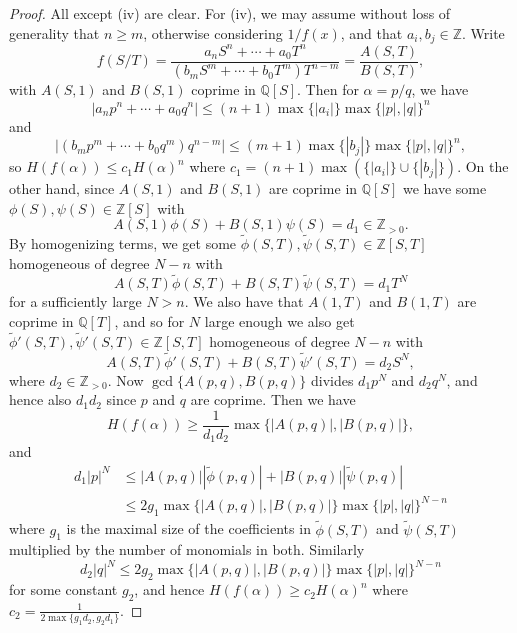\documentclass[a4paper]{article}
\theoremstyle{plain}
\theoremstyle{remark}
\theoremstyle{definition}
\newcommand{\Z}{\mathbb{Z}}
\newcommand{\Q}{\mathbb{Q}}
\begin{document}
\begin{proof}
    All except (iv) are clear. For (iv), we may assume without loss of
    generality that $n\ge m$, otherwise considering $1/f(x)$, and that
    $a_i,b_j\in\Z$. Write
    \begin{equation*}
        f(S/T)
            = \frac{a_nS^n+\cdots+a_0T^n}{(b_mS^m+\cdots+b_0T^m)T^{n-m}}
            = \frac{A(S,T)}{B(S,T)},
    \end{equation*}
    with $A(S,1)$ and $B(S,1)$ coprime in $\Q[S]$. Then for $\alpha=p/q$, we
    have
    \begin{equation*}
        |a_np^n+\cdots+a_0q^n|
            \le (n+1)\max\{|a_i|\}\max\{|p|,|q|\}^n
    \end{equation*}
    and
    \begin{equation*}
        |(b_mp^m+\cdots+b_0q^m)q^{n-m}|
            \le (m+1)\max\{|b_j|\}\max\{|p|,|q|\}^n,
    \end{equation*}
    so $H(f(\alpha))\le c_1H(\alpha)^n$ where
    $c_1=(n+1)\max(\{|a_i|\}\cup\{|b_j|\})$. On the other hand, since $A(S,1)$
    and $B(S,1)$ are coprime in $\Q[S]$ we have some $\phi(S),\psi(S)\in\Z[S]$
    with
    \begin{equation*}
        A(S,1)\phi(S)+B(S,1)\psi(S) = d_1\in\Z_{>0}.
    \end{equation*}
    By homogenizing terms, we get some
    $\tilde\phi(S,T),\tilde\psi(S,T)\in\Z[S,T]$ homogeneous of degree $N-n$ with
    \begin{equation*}
        A(S,T)\tilde\phi(S,T) + B(S,T)\tilde\psi(S,T) = d_1T^N
    \end{equation*}
    for a sufficiently large $N>n$. We also have that $A(1,T)$ and $B(1,T)$ are
    coprime in $\Q[T]$, and so for $N$ large enough we also get
    $\tilde\phi'(S,T),\tilde\psi'(S,T)\in\Z[S,T]$ homogeneous of degree $N-n$
    with
    \begin{equation*}
        A(S,T)\tilde\phi'(S,T) + B(S,T)\tilde\psi'(S,T) = d_2S^N,
    \end{equation*}
    where $d_2\in\Z_{>0}$. Now $\gcd\{A(p,q),B(p,q)\}$ divides $d_1p^N$ and
    $d_2q^N$, and hence also $d_1d_2$ since $p$ and $q$ are coprime. Then we
    have
    \begin{equation*}
        H(f(\alpha)) \ge \frac{1}{d_1d_2}\max\{|A(p,q)|,|B(p,q)|\},
    \end{equation*}
    and
    \begin{align*}
        d_1|p|^N
            &\le |A(p,q)||\tilde\phi(p,q)| + |B(p,q)||\tilde\psi(p,q)| \\
            &\le 2g_1\max\{|A(p,q)|,|B(p,q)|\}\max\{|p|,|q|\}^{N-n}
    \end{align*}
    where $g_1$ is the maximal size of the coefficients in $\tilde\phi(S,T)$ and
    $\tilde\psi(S,T)$ multiplied by the number of monomials in both. Similarly
    \begin{equation*}
        d_2|q|^N \le 2g_2\max\{|A(p,q)|,|B(p,q)|\}\max\{|p|,|q|\}^{N-n}
    \end{equation*}
    for some constant $g_2$, and hence $H(f(\alpha))\ge c_2H(\alpha)^n$ where
    $c_2=\frac{1}{2\max\{g_1d_2,g_2d_1\}}$.
\end{proof}
\end{document}
